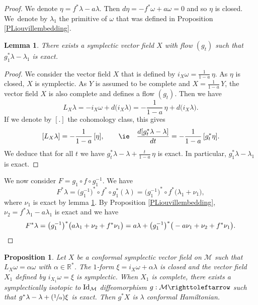 \documentclass[10pt]{amsart}
\newcommand{\Psfrac}[2]{(\sfrac{#1}{#2})}
\newtheorem{lemma}{Lemma}
\newtheorem{proposition}{Proposition}
\theoremstyle{definition}
\def\R{\mathbb{R}}
\def\cM{{\mathcal M}}
\begin{document}
\begin{proof}
We denote $\eta=f^*\lambda-a\lambda$. Then $d\eta=-f^*\omega+a\omega=0$ and so $\eta$ is closed. We~denote by $\lambda_1$ the primitive of $\omega$ that was defined in Proposition \ref{PLiouvillembedding}.

\begin{lemma}\label{L2}
There exists a symplectic vector field $X$ with flow $(g_t)$ such that $g_1^*\lambda-\lambda_1$ is exact.
\end{lemma}

\begin{proof}
We consider the vector field $X$ that is defined by $i_X\omega=\frac{1}{1-a}\,\eta$. As $\eta$ is closed, $X$ is symplectic. As $Y$ is assumed to be complete and $X=\frac{1}{1-a}\,Y$, the vector field $X$ is also complete and defines a flow $(g_t)$. Then we have\vspace*{-3pt}
\[
L_X\lambda=-i_X\omega+d\big(i_X\lambda\big)=-\frac{1}{1-a}\,\eta+d\big(i_X\lambda\big).
\]
If we denote by $[.]$ the cohomology class, this gives\vspace*{-3pt}
\[
[L_X\lambda]=-\frac{1}{1-a}\,[\eta],\qquad
\text{\ie}
\quad
\frac{d[g_t^*\lambda-\lambda]}{dt}=-\frac{1}{1-a}\,[g_t^*\eta].
\]
We deduce that for all $t$ we have
$g_t^*\lambda-\lambda+\frac{t}{1-a}\,\eta$ is exact. In particular, $g^*_1\lambda-\lambda_1$ is exact.
\end{proof}
We now consider $F=g_1\circ f\circ g_1^{-1}$. We have
\[
F^*\lambda=\big(g_1^{-1}\big)^*\circ f^*\circ g_1^*(\lambda)=\big(g_1^{-1}\big)^*\circ f^*\big( \lambda_1 +\nu_1\big),
\]
where $\nu_1$ is exact by lemma \ref{L2}. By Proposition \ref{PLiouvillembedding}, $\nu_2=f^*\lambda_1-a\lambda_1$ is exact and we have
\[
F^*\lambda=\big(g_1^{-1}\big)^* \big( a\lambda_1+\nu_2 + f^*\nu_1\big)=a\lambda+\big(g_1^{-1}\big)^{*}\big(-a\nu_1+\nu_2 + f^*\nu_1\big).\qedhere
\]
\end{proof}

\begin{proposition}\label{PCH}
Let $X$ be a conformal symplectic vector field on $\cM$ such that $L_X\omega=\alpha \omega$ with $\alpha\in\R^*$. The $1$-form $\xi=i_X\omega+\alpha\lambda$ is closed and the vector field $X_1$ defined by $i_{X_1}\omega=\xi$ is symplectic. When $X_1$ is complete, there exists a symplectically isotopic to ${\rm Id}_\cM$ diffeomorphism $g: \cM \righttoleftarrow$ such that $g^*\lambda-\lambda +\Psfrac{1}{\alpha}\xi$ is exact. Then $g^*X$ is $\lambda$ conformal Hamiltonian.
\end{proposition}
\end{document}
